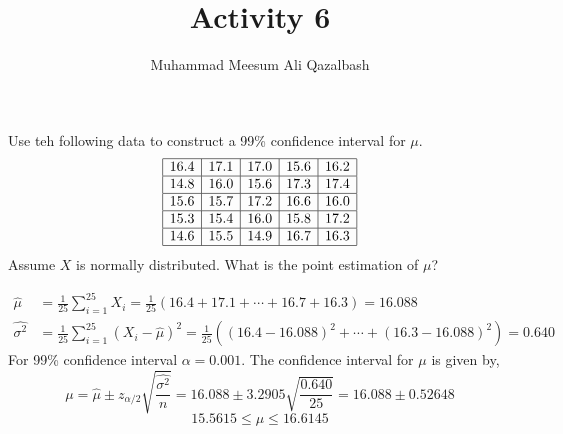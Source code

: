 \documentclass{exam}
\title{Activity 6}
\author{Muhammad Meesum Ali Qazalbash}
\theoremstyle{mytheoremstyle}
\theoremstyle{mytheoremstyle}
\theoremstyle{myproblemstyle}
\begin{document}
\maketitle
\begin{questions}
	\question Use teh following data to construct a 99\% confidence interval for \(\mu\).
	\begin{align*}
		\begin{array}{|c|c|c|c|c|}
			\hline
			16.4 & 17.1 & 17.0 & 15.6 & 16.2 \\\hline
			14.8 & 16.0 & 15.6 & 17.3 & 17.4 \\\hline
			15.6 & 15.7 & 17.2 & 16.6 & 16.0 \\\hline
			15.3 & 15.4 & 16.0 & 15.8 & 17.2 \\\hline
			14.6 & 15.5 & 14.9 & 16.7 & 16.3 \\\hline
		\end{array}
	\end{align*}
	Assume \(X\) is normally distributed. What is the point estimation of \(\mu\)?
	\begin{solution}
		\begin{align*}
			\hat{\mu}        & = \frac{1}{25} \sum_{i=1}^{25} X_i = \frac{1}{25} \left( 16.4 + 17.1 + \cdots + 16.7 + 16.3 \right) = \boxed{16.088}                     \\
			\hat{\sigma^{2}} & = \frac{1}{25} \sum_{i=1}^{25} (X_i - \hat{\mu})^2 = \frac{1}{25} \left( (16.4 - 16.088)^2 + \cdots  + (16.3 - 16.088)^2 \right) = 0.640
		\end{align*}
		For 99\% confidence interval \(\alpha=0.001\). The confidence interval for \(\mu\) is given by,
		\[
			\mu=\hat{\mu} \pm z_{\alpha/2} \sqrt{\frac{\hat{\sigma^{2}}}{n}} = 16.088 \pm 3.2905 \sqrt{\frac{0.640}{25}} = 16.088 \pm 0.52648
		\]
		\[\boxed{15.5615\le \mu\le 16.6145}\]


	\end{solution}

	\newpage


\end{questions}
\end{document}
